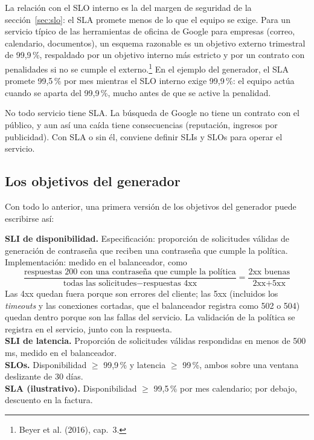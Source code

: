 \documentclass[variant=apuntes,cover=institutional,mode=screen]{ua-engineering-v6-article}
\begin{document}
La relación con el SLO interno es la del margen de seguridad de la sección~\ref{sec:slo}: el SLA promete menos de lo que el equipo se exige. Para un servicio típico de las herramientas de oficina de Google para empresas (correo, calendario, documentos), un esquema razonable es un objetivo externo trimestral de 99,9\,\%, respaldado por un objetivo interno más estricto y por un contrato con penalidades si no se cumple el externo.\footnote{Beyer et al. (2016), cap.~3.} En el ejemplo del generador, el SLA promete 99,5\,\% por mes mientras el SLO interno exige 99,9\,\%: el equipo actúa cuando se aparta del 99,9\,\%, mucho antes de que se active la penalidad.

No todo servicio tiene SLA. La búsqueda de Google no tiene un contrato con el público, y aun así una caída tiene consecuencias (reputación, ingresos por publicidad). Con SLA o sin él, conviene definir SLIs y SLOs para operar el servicio.

\subsection{Los objetivos del generador}\label{sec:objetivos-generador}

Con todo lo anterior, una primera versión de los objetivos del generador puede escribirse así:

\begin{uainfo}
\textbf{SLI de disponibilidad.} Especificación: proporción de solicitudes válidas de generación de contraseña que reciben una contraseña que cumple la política. Implementación: medido en el balanceador, como
\[
\frac{\text{respuestas 200 con una contraseña que cumple la política}}{\text{todas las solicitudes} - \text{respuestas 4xx}} = \frac{\text{2xx buenas}}{\text{2xx} + \text{5xx}}
\]
Las 4xx quedan fuera porque son errores del cliente; las 5xx (incluidos los \emph{timeouts} y las conexiones cortadas, que el balanceador registra como 502 o 504) quedan dentro porque son las fallas del servicio. La validación de la política se registra en el servicio, junto con la respuesta.\\[2pt]
\textbf{SLI de latencia.} Proporción de solicitudes válidas respondidas en menos de 500\,ms, medido en el balanceador.\\[2pt]
\textbf{SLOs.} Disponibilidad $\ge$ 99,9\,\% y latencia $\ge$ 99\,\%, ambos sobre una ventana deslizante de 30 días.\\[2pt]
\textbf{SLA (ilustrativo).} Disponibilidad $\ge$ 99,5\,\% por mes calendario; por debajo, descuento en la factura.
\end{uainfo}
\end{document}
